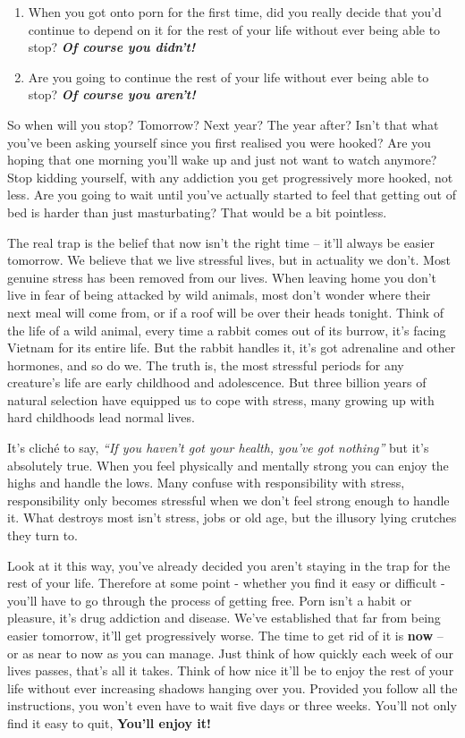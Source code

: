 \documentclass[
]{book}
\begin{document}
\begin{enumerate}
\def\labelenumi{\arabic{enumi}.}
\item
  When you got onto porn for the first time, did you really decide that you'd continue to depend on it for the rest of your life without ever being able to stop? \textbf{\emph{Of course you didn't!}}
\item
  Are you going to continue the rest of your life without ever being able to stop? \textbf{\emph{Of course you aren't!}}
\end{enumerate}

So when will you stop? Tomorrow? Next year? The year after? Isn't that what you've been asking yourself since you first realised you were hooked? Are you hoping that one morning you'll wake up and just not want to watch anymore? Stop kidding yourself, with any addiction you get progressively more hooked, not less. Are you going to wait until you've actually started to feel that getting out of bed is harder than just masturbating? That would be a bit pointless.

The real trap is the belief that now isn't the right time -- it'll always be easier tomorrow. We believe that we live stressful lives, but in actuality we don't. Most genuine stress has been removed from our lives. When leaving home you don't live in fear of being attacked by wild animals, most don't wonder where their next meal will come from, or if a roof will be over their heads tonight. Think of the life of a wild animal, every time a rabbit comes out of its burrow, it's facing Vietnam for its entire life. But the rabbit handles it, it's got adrenaline and other hormones, and so do we. The truth is, the most stressful periods for any creature's life are early childhood and adolescence. But three billion years of natural selection have equipped us to cope with stress, many growing up with hard childhoods lead normal lives.

It's cliché to say, \emph{``If you haven't got your health, you've got nothing''} but it's absolutely true. When you feel physically and mentally strong you can enjoy the highs and handle the lows. Many confuse with responsibility with stress, responsibility only becomes stressful when we don't feel strong enough to handle it. What destroys most isn't stress, jobs or old age, but the illusory lying crutches they turn to.

Look at it this way, you've already decided you aren't staying in the trap for the rest of your life. Therefore at some point - whether you find it easy or difficult - you'll have to go through the process of getting free. Porn isn't a habit or pleasure, it's drug addiction and disease. We've established that far from being easier tomorrow, it'll get progressively worse. The time to get rid of it is \textbf{now} -- or as near to now as you can manage. Just think of how quickly each week of our lives passes, that's all it takes. Think of how nice it'll be to enjoy the rest of your life without ever increasing shadows hanging over you. Provided you follow all the instructions, you won't even have to wait five days or three weeks. You'll not only find it easy to quit, \textbf{You'll enjoy it!}
\end{document}
